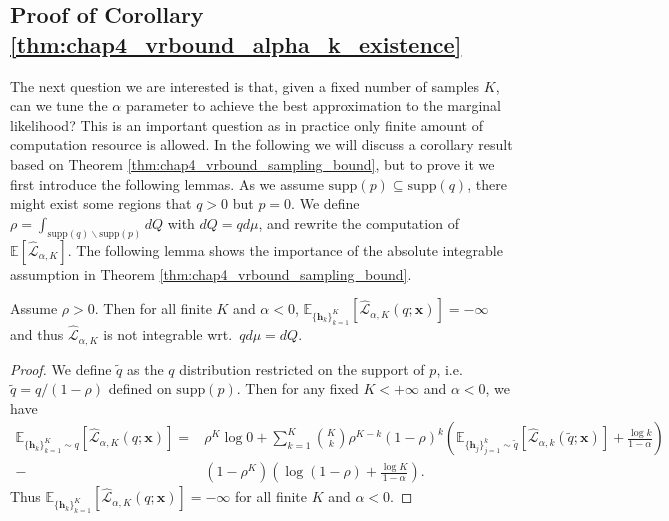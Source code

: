 \subsection{Proof of Corollary \ref{thm:chap4_vrbound_alpha_k_existence} }

The next question we are interested is that, given a fixed number of samples $K$, can we tune the $\alpha$ parameter to achieve the best approximation to the marginal likelihood? This is an important question as in practice only finite amount of computation resource is allowed. In the following we will discuss a corollary result based on Theorem \ref{thm:chap4_vrbound_sampling_bound}, but to prove it we first introduce the following lemmas. As we assume $\text{supp}(p) \subseteq \text{supp}(q)$, there might exist some regions that $q > 0$ but $p = 0$. We define $\rho = \int_{\text{supp}(q) \backslash \text{supp}(p)}dQ$ with $dQ = qd\mu$, and rewrite the computation of $\mathbb{E}[\hat{\mathcal{L}}_{\alpha, K}]$. The following lemma shows the importance of the absolute integrable assumption in Theorem \ref{thm:chap4_vrbound_sampling_bound}.


\begin{lemma}
Assume $\rho > 0$. Then for all finite $K$ and $\alpha < 0$, $\mathbb{E}_{\{\bm{h}_k\}_{k=1}^K} [ \hat{\mathcal{L}}_{\alpha, K}(q; \bm{x}) ] = -\infty$ and thus $\hat{\mathcal{L}}_{\alpha, K}$ is not integrable wrt.~$qd\mu = dQ$.
\label{lemma:chap4_vrbound_alpha_k_non_exist}
\end{lemma}

\begin{proof}
We define $\tilde{q}$ as the $q$ distribution restricted on the support of $p$, i.e.~$\tilde{q} = q / (1 - \rho)$ defined on $\text{supp}(p)$. Then for any fixed $K < +\infty$ and $\alpha < 0$, we have
\begin{equation*}
\begin{aligned}
\mathbb{E}_{\{\bm{h}_k\}_{k=1}^K \sim q} [ \hat{\mathcal{L}}_{\alpha, K}(q; \bm{x}) ] 
=& \rho^{K} \log 0 
+ \sum_{k=1}^K {K \choose k} \rho^{K - k} (1 - \rho)^{k} \left( \mathbb{E}_{\{\bm{h}_j\}_{j=1}^k \sim \tilde{q}}[\hat{\mathcal{L}}_{\alpha, k}(\tilde{q}; \bm{x})] + \frac{ \log k }{1 - \alpha} \right) \\
-& (1 - \rho^K) \left( \log (1 - \rho) + \frac{\log K}{1 - \alpha} \right) .
\end{aligned}
\end{equation*}
Thus $\mathbb{E}_{\{\bm{h}_k\}_{k=1}^K} [ \hat{\mathcal{L}}_{\alpha, K}(q; \bm{x}) ] = -\infty$ for all finite $K$ and $\alpha < 0$. 
\end{proof}

